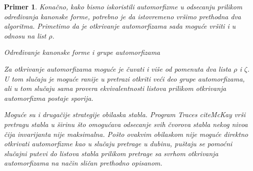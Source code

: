 \documentclass[12pt,oneside]{memoir}
\newtheorem{example}{Primer}
\theoremstyle{definition}
\begin{document}
\begin{example}
  Konačno, kako bismo iskoristili automorfizme u odsecanju prilikom određivanja
  kanonske forme, potrebno je da istovremeno vršimo prethodna dva algoritma.
  Primetimo da je otkrivanje automorfizama sada moguće vršiti i u odnosu na
  list $\rho$.

  \begin{algorithm}[H]
	  \caption{Određivanje kanonske forme i grupe automorfizama}
	  \begin{algorithmic}[1]
			\State \Return {$|\nu|$}
		  \EndIf
					\State {}
				\EndIf
			\EndIf
		  \EndFor
				\State {$\rho \gets \nu$}
			\EndIf

			\If {$\zeta = ()$}
				\State {$\zeta \gets \nu$}
			\EndIf

			\EndIf
					\State {}
				\EndIf
				\State {}
			\EndIf

		  \EndIf
		  \State \Return{$|\nu|$}
		  \EndProcedure
	  \end{algorithmic}
  \end{algorithm}

  Za otkrivanje automorfizama moguće je čuvati i više od pomenuta dva lista
  $\rho$ i $\zeta$. U tom slučaju je moguće ranije u pretrazi otkriti veći deo
  grupe automorfizama, ali u tom slučaju sama provera ekvivalentnosti listova
  prilikom otkrivanja automorfizma postaje sporija.

  Moguće su i drugačije strategije obilaska stabla. Program Traces cite{McKay}
  vrši pretragu stabla u širinu što omogućava odsecanje svih čvorova stabla
  nekog nivoa čija invarijanta nije maksimalna. Pošto ovakvim obilaskom nije
  moguće direktno otkrivati automorfizme kao u slučaju pretrage u dubinu,
  puštaju se pomoćni slučajni putevi do listova stabla prilikom pretrage sa
  svrhom otkrivanja automorfizama na način sličan prethodno opisanom.


\end{example}
\end{document}
